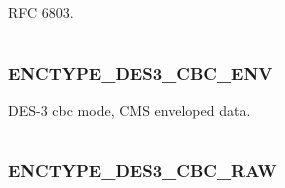 \documentclass[letterpaper,10pt,english]{sphinxmanual}
\begin{document}
\begin{fulllineitems}
\label{appdev/refs/macros/ENCTYPE_CAMELLIA256_CTS_CMAC:ENCTYPE_CAMELLIA256_CTS_CMAC}
\end{fulllineitems}


RFC 6803.

\begin{tabulary}{\linewidth}{|L|L|}
\hline

 & 
\\\hline
\end{tabulary}



\subsubsection{ENCTYPE\_DES3\_CBC\_ENV}
\label{appdev/refs/macros/ENCTYPE_DES3_CBC_ENV::doc}\label{appdev/refs/macros/ENCTYPE_DES3_CBC_ENV:enctype-des3-cbc-env}\label{appdev/refs/macros/ENCTYPE_DES3_CBC_ENV:enctype-des3-cbc-env-data}

\begin{fulllineitems}
\label{appdev/refs/macros/ENCTYPE_DES3_CBC_ENV:ENCTYPE_DES3_CBC_ENV}
\end{fulllineitems}


DES-3 cbc mode, CMS enveloped data.

\begin{tabulary}{\linewidth}{|L|L|}
\hline

 & 
\\\hline
\end{tabulary}



\subsubsection{ENCTYPE\_DES3\_CBC\_RAW}
\label{appdev/refs/macros/ENCTYPE_DES3_CBC_RAW:enctype-des3-cbc-raw}\label{appdev/refs/macros/ENCTYPE_DES3_CBC_RAW::doc}\label{appdev/refs/macros/ENCTYPE_DES3_CBC_RAW:enctype-des3-cbc-raw-data}

\begin{fulllineitems}
\label{appdev/refs/macros/ENCTYPE_DES3_CBC_RAW:ENCTYPE_DES3_CBC_RAW}
\end{fulllineitems}
\end{document}
